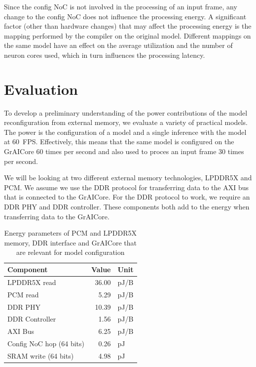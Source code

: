 Since the config NoC is not involved in the processing of an input frame, any change to the config NoC does not influence the processing energy.
A significant factor (other than hardware changes) that may affect the processing energy is the mapping performed by the compiler on the original model. 
Different mappings on the same model have an effect on the average utilization and the number of neuron cores used, which in turn influences the processing latency.

\section{Evaluation}
To develop a preliminary understanding of the power contributions of the model reconfiguration from external memory, we evaluate a variety of practical models.
The power is the configuration of a model and a single inference with the model at \SI{60}{FPS}.
Effectively, this means that the same model is configured on the GrAICore 60 times per second and also used to proces an input frame 30 times per second.

We will be looking at two different external memory technologies, LPDDR5X and PCM.
We assume we use the DDR protocol for transferring data to the AXI bus that is connected to the GrAICore.
For the DDR protocol to work, we require an DDR PHY and DDR controller.
These components both add to the energy when transferring data to the GrAICore.

\begin{table}[hbtp]
    \centering
    \begin{tabular}{@{}lrl@{}}
    \toprule
    \textbf{Component} & \textbf{Value} & \textbf{Unit} \\
    \midrule
    LPDDR5X read             & 36.00 & pJ/B \\
    PCM read                 & 5.29 & pJ/B  \\
    DDR PHY                  & 10.39 & pJ/B \\
    DDR Controller           & 1.56 & pJ/B  \\
    AXI Bus                  & 6.25 & pJ/B  \\
    Config NoC hop (64 bits) & 0.26 & pJ    \\
    SRAM write (64 bits)     & 4.98 & pJ    \\ \bottomrule
    \end{tabular}
    \caption{Energy parameters of PCM and LPDDR5X memory, DDR interface and GrAICore that are relevant for model configuration}
    \label{tab:energy_parameters}
\end{table}

